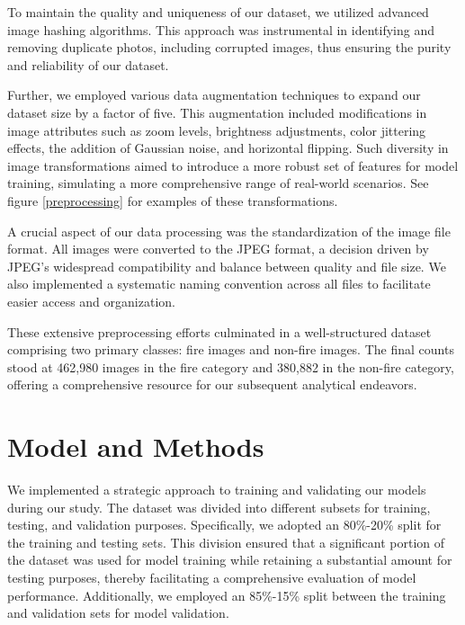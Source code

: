 To maintain the quality and uniqueness of our dataset, we utilized advanced image hashing algorithms. This approach was instrumental in identifying and removing duplicate photos, including corrupted images, thus ensuring the purity and reliability of our dataset.

Further, we employed various data augmentation techniques to expand our dataset size by a factor of five. This augmentation included modifications in image attributes such as zoom levels, brightness adjustments, color jittering effects, the addition of Gaussian noise, and horizontal flipping. Such diversity in image transformations aimed to introduce a more robust set of features for model training, simulating a more comprehensive range of real-world scenarios. See figure \ref{preprocessing} for examples of these transformations.

A crucial aspect of our data processing was the standardization of the image file format. All images were converted to the JPEG format, a decision driven by JPEG's widespread compatibility and balance between quality and file size. We also implemented a systematic naming convention across all files to facilitate easier access and organization.

These extensive preprocessing efforts culminated in a well-structured dataset comprising two primary classes: fire images and non-fire images. The final counts stood at 462,980 images in the fire category and 380,882 in the non-fire category, offering a comprehensive resource for our subsequent analytical endeavors.

\section{Model and Methods}

We implemented a strategic approach to training and validating our models during our study. The dataset was divided into different subsets for training, testing, and validation purposes. Specifically, we adopted an 80\%-20\% split for the training and testing sets. This division ensured that a significant portion of the dataset was used for model training while retaining a substantial amount for testing purposes, thereby facilitating a comprehensive evaluation of model performance. Additionally, we employed an 85\%-15\% split between the training and validation sets for model validation.

